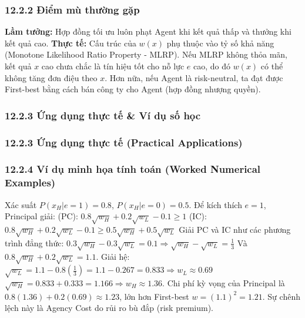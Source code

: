 \documentclass[
]{article}
\begin{document}
\subsubsection{12.2.2 Điểm mù thường
gặp}\label{ux111iux1ec3m-muxf9-thux1b0ux1eddng-gux1eb7p-1}

\textbf{Lầm tưởng:} Hợp đồng tối ưu luôn phạt Agent khi kết quả thấp và
thưởng khi kết quả cao. \textbf{Thực tế:} Cấu trúc của \(w(x)\) phụ
thuộc vào tỷ số khả năng (Monotone Likelihood Ratio Property - MLRP).
Nếu MLRP không thỏa mãn, kết quả \(x\) cao chưa chắc là tín hiệu tốt cho
nỗ lực \(e\) cao, do đó \(w(x)\) có thể không tăng đơn điệu theo \(x\).
Hơn nữa, nếu Agent là risk-neutral, ta đạt được First-best bằng cách bán
công ty cho Agent (hợp đồng nhượng quyền).

\subsubsection{12.2.3 Ứng dụng thực tế \& Ví dụ số
học}\label{ux1ee9ng-dux1ee5ng-thux1ef1c-tux1ebf-vuxed-dux1ee5-sux1ed1-hux1ecdc-1}

\subsubsection{12.2.3 Ứng dụng thực tế (Practical
Applications)}\label{ux1ee9ng-dux1ee5ng-thux1ef1c-tux1ebf-practical-applications-41}

\subsubsection{12.2.4 Ví dụ minh họa tính toán (Worked Numerical
Examples)}\label{vuxed-dux1ee5-minh-hux1ecda-tuxednh-touxe1n-worked-numerical-examples-33}

Xác suất \(P(x_H|e=1) = 0.8\), \(P(x_H|e=0) = 0.5\). Để kích thích
\(e=1\), Principal giải: (PC):
\(0.8\sqrt{w_H} + 0.2\sqrt{w_L} - 0.1 \geq 1\) (IC):
\(0.8\sqrt{w_H} + 0.2\sqrt{w_L} - 0.1 \geq 0.5\sqrt{w_H} + 0.5\sqrt{w_L}\)
Giải PC và IC như các phương trình đẳng thức:
\(0.3\sqrt{w_H} - 0.3\sqrt{w_L} = 0.1 \Rightarrow \sqrt{w_H} - \sqrt{w_L} = \frac{1}{3}\)
Và \(0.8\sqrt{w_H} + 0.2\sqrt{w_L} = 1.1\). Giải hệ:
\(\sqrt{w_L} = 1.1 - 0.8(\frac{1}{3}) = 1.1 - 0.267 = 0.833 \Rightarrow w_L \approx 0.69\)
\(\sqrt{w_H} = 0.833 + 0.333 = 1.166 \Rightarrow w_H \approx 1.36\). Chi
phí kỳ vọng của Principal là \(0.8(1.36) + 0.2(0.69) \approx 1.23\), lớn
hơn First-best \(w = (1.1)^2 = 1.21\). Sự chênh lệch này là Agency Cost
do rủi ro bù đắp (risk premium).
\end{document}
